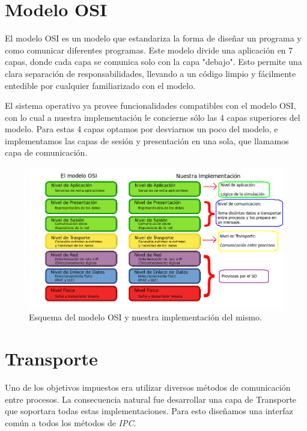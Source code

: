 \documentclass[a4paper,10pt]{article}
\begin{document}
\newpage
\section{Modelo OSI}

El modelo OSI es un modelo que estandariza la forma de diseñar un programa y como comunicar diferentes programas. 
Este modelo divide una aplicación en 7 capas, donde cada capa se comunica solo con la capa "debajo".
Esto permite una clara separación de responsabilidades, llevando a un código limpio y fácilmente entedible por cualquier familiarizado con el modelo.

El sistema operativo ya provee funcionalidades compatibles con el modelo OSI, con lo cual a nuestra implementación le concierne sólo las 4 capas superiores del modelo.
Para estas 4 capas optamos por desviarnos un poco del modelo, e implementamos las capas de sesión y presentación en una sola, que llamamos capa de comunicación.

\begin{figure}[H]
\begin{center}
 \includegraphics[scale=0.5]{./images/modelo-osi_nuestro.png}
 \caption{Esquema del modelo OSI y nuestra implementación del mismo.}
\end{center}
\end{figure}


\newpage
\section{Transporte}
Uno de los objetivos impuestos era utilizar diversos métodos de comunicación entre procesos.
La consecuencia natural fue desarrollar una capa de Transporte que soportara todas estas implementaciones.
Para esto diseñamos una interfaz común a todos los métodos de \textit{IPC}.
\end{document}
